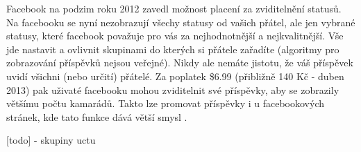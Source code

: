 \documentclass[thesis=M,czech]{FITthesis}[2013/05/10]
\begin{document}
Facebook na podzim roku 2012 zavedl možnost placení za zviditelnění statusů. Na facebooku se nyní nezobrazují všechy statusy od vašich přátel, ale jen vybrané statusy, které facebook považuje pro vás za nejhodnotnější a nejkvalitnější. Vše jde nastavit a ovlivnit skupinami do kterých si přátele zařadíte (algoritmy pro zobrazování příspěvků nejsou veřejné). Nikdy ale nemáte jistotu, že váš příspěvek uvidí všichni (nebo určití) přátelé. Za poplatek \$6.99 (přibližně 140 Kč - duben 2013) pak uživaté facebooku mohou zviditelnit své příspěvky, aby se zobrazily většímu počtu kamarádů. Takto lze promovat příspěvky i u facebookových stránek, kde tato funkce dává větší smysl \cite{oa} \cite{web:nist-cloud}.


[todo] - skupiny uctu



\appendix
\end{document}
